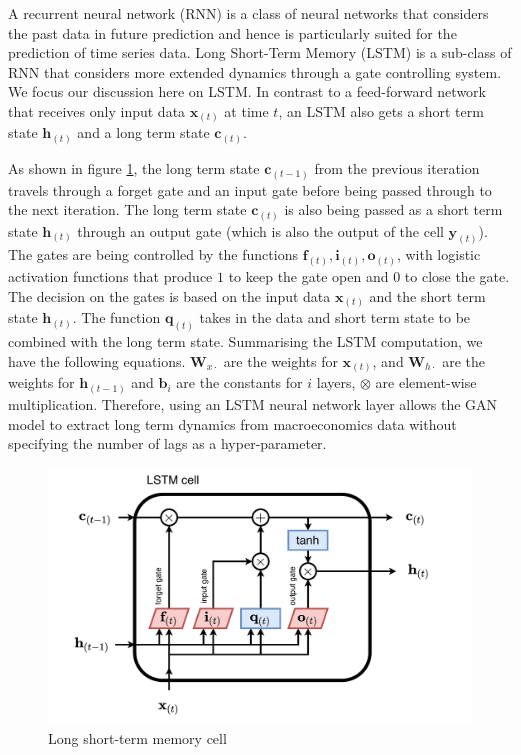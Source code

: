 \documentclass[12pt]{article}
\begin{document}
A recurrent neural network (RNN) is a class of neural
networks that considers the past data in future prediction
and hence is particularly suited for the prediction of time
series data.
Long Short-Term Memory (LSTM) is a sub-class of RNN that
considers more extended dynamics through a gate controlling
system.
We focus our discussion here on LSTM.
In contrast to a feed-forward network that receives only
input data \(\mathbf{x}_{(t)}\) at time \(t\),
an LSTM also gets a short term state
\(\mathbf{h}_{(t)}\) and a long term state \(\mathbf{c}_{(t)}\).

As shown in figure \ref{fig:lstmcell}, the long term state
\(\mathbf{c}_{(t-1)}\) from the previous iteration travels
through a forget gate and an input
gate before being passed through to the next iteration.
The long term state \(\mathbf{c}_{(t)}\) is also being passed
as a short term state \(\mathbf{h}_{(t)}\) through an output
gate (which is also the output of the cell \(\mathbf{y}_{(t)}\)).
The gates are being controlled by the functions
\(\mathbf{f}_{(t)}, \mathbf{i}_{(t)}, \mathbf{o}_{(t)}\), with
logistic activation functions that produce \(1\) to keep the
gate open and \(0\) to close the gate. The decision on the
gates is based on the input data \(\mathbf{x}_{(t)}\) and
the short term state \(\mathbf{h}_{(t)}\). The function
\(\mathbf{q}_{(t)}\) takes in the data and short term state to
be combined with the long term state.
Summarising the LSTM computation, we have the following
equations. \(\mathbf{W}_{x\cdot}\) are the weights for
\(\mathbf{x}_{(t)}\), and \(\mathbf{W}_{h\cdot}\) are the weights
for \(\mathbf{h}_{(t-1)}\) and \(\mathbf{b}_i\) are the constants for
\(i\) layers, \(\otimes\) are element-wise multiplication.
Therefore, using an LSTM neural network layer allows the GAN
model to extract long term dynamics from macroeconomics data
without specifying the number of lags as a hyper-parameter.

\begin{figure}
\centering
\includegraphics{./src/lstm}
\caption{\label{fig:lstmcell} Long short-term memory cell}
\end{figure}
\end{document}
